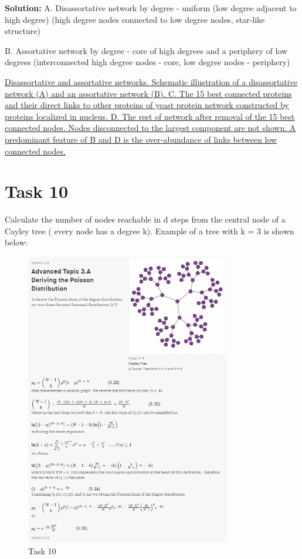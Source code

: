 \documentclass{cernatsnote}
\begin{document}
\textbf{Solution:}  A. Disassortative network by degree - uniform (low degree adjacent to high degree) (high degree nodes connected to low degree nodes, star-like structure)

B.  Assortative network by degree - core of high degrees and a periphery of low degrees (interconnected high degree nodes - core, low degree nodes - periphery)

\href{https://doi.org/10.1371/journal.pone.0028322.g001}{Disassortative and assortative networks. Schematic illustration of a disassortative network (A) and an assortative network (B). C. The 15 best connected proteins and their direct links to other proteins of yeast protein network constructed by proteins localized in nucleus. D. The rest of network after removal of the 15 best connected nodes. Nodes disconnected to the largest component are not shown. A predominant feature of B and D is the over-abundance of links between low connected nodes.} 

\section{Task 10} 
Calculate the number of nodes reachable in d steps from the central node of a Cayley tree ( every node has a degree k). Example of a tree with k = 3 is shown below:

\begin{figure}[h!]
\centering
\includegraphics[width=0.8\textwidth]{images/task10.png}
\caption{\label{fig:task9} Task 10}
\end{figure}
\end{document}
